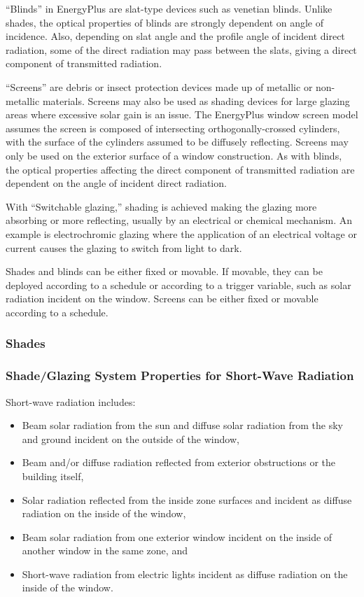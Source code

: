 ``Blinds'' in EnergyPlus are slat-type devices such as venetian blinds. Unlike shades, the optical properties of blinds are strongly dependent on angle of incidence. Also, depending on slat angle and the profile angle of incident direct radiation, some of the direct radiation may pass between the slats, giving a direct component of transmitted radiation.

``Screens'' are debris or insect protection devices made up of metallic or non-metallic materials. Screens may also be used as shading devices for large glazing areas where excessive solar gain is an issue. The EnergyPlus window screen model assumes the screen is composed of intersecting orthogonally-crossed cylinders, with the surface of the cylinders assumed to be diffusely reflecting. Screens may only be used on the exterior surface of a window construction. As with blinds, the optical properties affecting the direct component of transmitted radiation are dependent on the angle of incident direct radiation.

With ``Switchable glazing,'' shading is achieved making the glazing more absorbing or more reflecting, usually by an electrical or chemical mechanism. An example is electrochromic glazing where the application of an electrical voltage or current causes the glazing to switch from light to dark.

Shades and blinds can be either fixed or movable. If movable, they can be deployed according to a schedule or according to a trigger variable, such as solar radiation incident on the window. Screens can be either fixed or movable according to a schedule.

\subsubsection{Shades}\label{shades}

\subsubsection{Shade/Glazing System Properties for Short-Wave Radiation}\label{shadeglazing-system-properties-for-short-wave-radiation}

Short-wave radiation includes:

\begin{itemize}
\item Beam solar radiation from the sun and diffuse solar radiation from the sky and ground incident on the outside of the window,
\item Beam and/or diffuse radiation reflected from exterior obstructions or the building itself,
\item Solar radiation reflected from the inside zone surfaces and incident as diffuse radiation on the inside of the window,
\item Beam solar radiation from one exterior window incident on the inside of another window in the same zone, and
\item Short-wave radiation from electric lights incident as diffuse radiation on the inside of the window.
\end{itemize}

